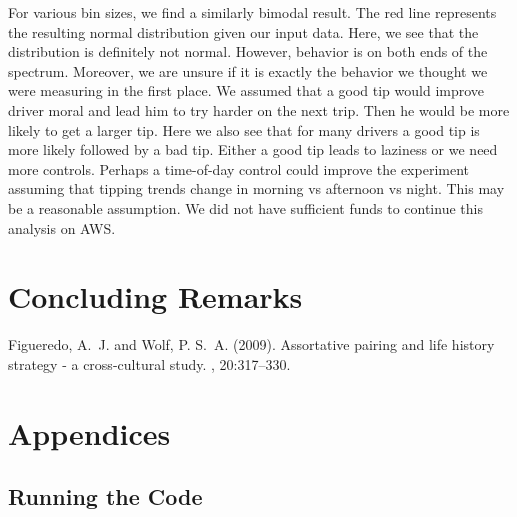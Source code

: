 \documentclass[twoside]{article}
\begin{document}
\begin{multicols}{2}
For various bin sizes, we find a similarly bimodal result. The red line represents the resulting normal distribution given our input data. Here, we see that the distribution is definitely not normal. However, behavior is on both ends of the spectrum. Moreover, we are unsure if it is exactly the behavior we thought we were measuring in the first place. We assumed that a good tip would improve driver moral and lead him to try harder on the next trip.  Then he would be more likely to get a larger tip.  Here we also see that for many drivers a good tip is more likely followed by a bad tip.  Either a good tip leads to laziness or we need more controls. Perhaps a time-of-day control could improve the experiment assuming that tipping trends change in morning vs afternoon vs night. This may be a reasonable assumption. We did not have sufficient funds to continue this analysis on AWS. 


\section{Concluding Remarks}



\begin{thebibliography}{99} %

Figueredo, A.~J. and Wolf, P. S.~A. (2009).
\newblock Assortative pairing and life history strategy - a cross-cultural
  study.
, 20:317--330.
 
\end{thebibliography}


\section*{Appendices}

\subsection{Running the Code}


\end{multicols}
\end{document}
